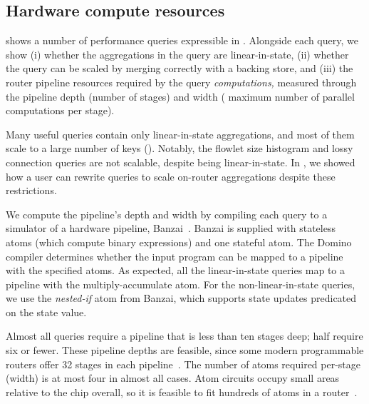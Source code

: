 \subsection{Hardware compute resources}
\label{s:eval:hardware}
\label{sec:eval:hardware}

 shows a number of performance queries
expressible in \TheSystem. Alongside each query, we show (i) whether the
aggregations in the query are linear-in-state, (ii) whether the query can be
scaled by merging correctly with a backing store, and
(iii) the router pipeline resources required by the query {\em computations,}
measured through the pipeline depth (\ie number of stages) and width (\ie
maximum number of parallel computations per stage).

Many useful queries contain only linear-in-state aggregations, and most of them
scale to a large number of keys (). Notably,
the flowlet size histogram and lossy connection queries are not scalable,
despite being linear-in-state. In , we showed how a
user can rewrite queries to scale on-router aggregations despite these
restrictions.

We compute the pipeline's depth and width by compiling each query to a simulator
of a hardware pipeline, Banzai~\cite{domino_sigcomm}. Banzai is supplied with
stateless atoms (which compute binary expressions) and one stateful atom. The
Domino compiler determines whether the input program can be mapped to a pipeline
with the specified atoms. As expected, all the linear-in-state queries map to a
pipeline with the multiply-accumulate atom. For the non-linear-in-state queries,
we use the {\em nested-if} atom from Banzai, which supports state updates
predicated on the state value.

Almost all queries require a pipeline that is less than ten stages deep; half
require six or fewer. These pipeline depths are feasible, since some modern
programmable routers offer 32 stages in each pipeline~\cite{rmt}. The number of
atoms required per-stage (width) is at most four in almost all cases.  Atom
circuits occupy small areas relative to the chip overall, so it is feasible to
fit hundreds of atoms in a router~\cite{domino_sigcomm}.
